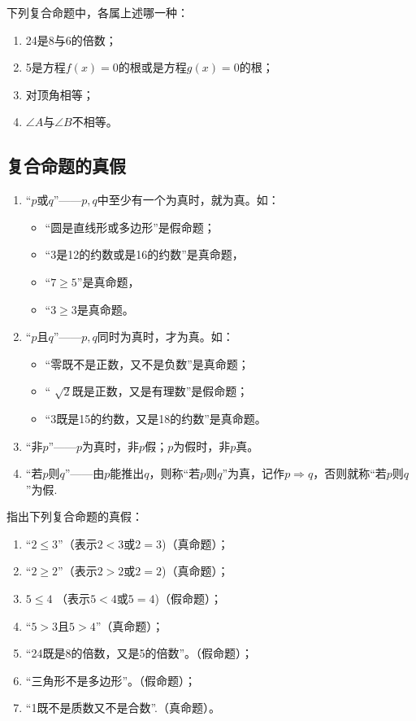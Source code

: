 \begin{blk}
 下列复合命题中，各属上述哪一种：   
\begin{enumerate}[(1)]
\item 24是8与6的倍数；
\item 5是方程$f(x)=0$的根或是方程$g(x)=0$的根；
\item 对顶角相等；
\item $\angle A$与$\angle B$不相等。
\end{enumerate}
\end{blk}

\subsection*{复合命题的真假}
\begin{enumerate}[(1)]
    \item “$p$或$q$”——$p,q$中至少有一个为真时，就为真。如：
\begin{itemize}
\item “圆是直线形或多边形”是假命题；
\item “3是12的约数或是16的约数”是真命题，
\item “$7\ge 5$”是真命题，
\item “$3\ge 3$是真命题。
\end{itemize}
\item “$p$且$q$”——$p,q$同时为真时，才为真。如：
\begin{itemize}
    \item 
    “零既不是正数，又不是负数”是真命题；
    \item “
    $\sqrt{2}$既是正数，又是有理数”是假命题；
    \item 
    “3既是15的约数，又是18的约数”是真命题。    
\end{itemize}
    \item “非$p$”——$p$为真时，非$p$假；$p$为假时，非$p$真。
    \item “若$p$则$q$”——由$p$能推出$q$，则称“若$p$则$q$”为真，记作$p\Rightarrow q$，否则就称“若$p$则$q$”为假.
\end{enumerate}

\begin{example}
    指出下列复合命题的真假：
\begin{enumerate}[(1)]
    \item 
“$2\le 3$”（表示$2<3$或$2=3$)\hfill（真命题）；
\item 
“$2\ge 2$”（表示$2>2$或$2=2$)\hfill（真命题）；
\item $5\le 4$
（表示$5<4$或$5=4$)\hfill（假命题）；
\item 
“$5>3$且$5>4$”\hfill（真命题）；
\item 
“24既是8的倍数，又是5的倍数”。\hfill（假命题）；
\item 
“三角形不是多边形”。\hfill（假命题）；
\item 
“1既不是质数又不是合数”.\hfill（真命题）。
\end{enumerate}
\end{example}

